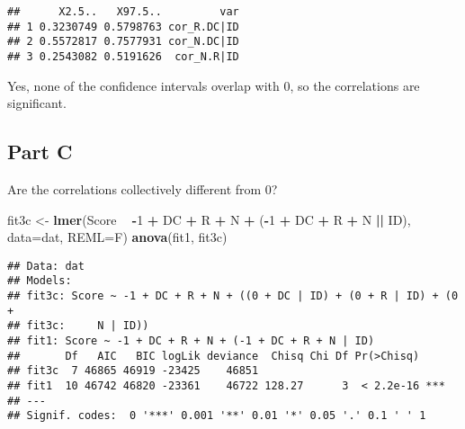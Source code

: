 \documentclass[]{article}
\newenvironment{Shaded}{\begin{snugshade}}{\end{snugshade}}
\newcommand{\KeywordTok}[1]{\textcolor[rgb]{0.13,0.29,0.53}{\textbf{#1}}}
\newcommand{\DataTypeTok}[1]{\textcolor[rgb]{0.13,0.29,0.53}{#1}}
\newcommand{\DecValTok}[1]{\textcolor[rgb]{0.00,0.00,0.81}{#1}}
\newcommand{\StringTok}[1]{\textcolor[rgb]{0.31,0.60,0.02}{#1}}
\newcommand{\OperatorTok}[1]{\textcolor[rgb]{0.81,0.36,0.00}{\textbf{#1}}}
\newcommand{\NormalTok}[1]{#1}
\begin{document}
\begin{Shaded}
\end{Shaded}

\begin{verbatim}
##      X2.5..   X97.5..         var
## 1 0.3230749 0.5798763 cor_R.DC|ID
## 2 0.5572817 0.7577931 cor_N.DC|ID
## 3 0.2543082 0.5191626  cor_N.R|ID
\end{verbatim}

Yes, none of the confidence intervals overlap with 0, so the
correlations are significant.

\subsection{Part C}\label{part-c}

Are the correlations collectively different from 0?

\begin{Shaded}
\begin{Highlighting}[]
\NormalTok{fit3c <-}\StringTok{ }\KeywordTok{lmer}\NormalTok{(Score }\OperatorTok{~}\StringTok{ }\OperatorTok{-}\DecValTok{1} \OperatorTok{+}\StringTok{ }\NormalTok{DC }\OperatorTok{+}\StringTok{ }\NormalTok{R }\OperatorTok{+}\StringTok{ }\NormalTok{N }\OperatorTok{+}\StringTok{ }
\StringTok{                 }\NormalTok{(}\OperatorTok{-}\DecValTok{1} \OperatorTok{+}\StringTok{ }\NormalTok{DC }\OperatorTok{+}\StringTok{ }\NormalTok{R }\OperatorTok{+}\StringTok{ }\NormalTok{N }\OperatorTok{||}\StringTok{ }\NormalTok{ID), }\DataTypeTok{data=}\NormalTok{dat,}
                 \DataTypeTok{REML=}\NormalTok{F)}
\KeywordTok{anova}\NormalTok{(fit1, fit3c)}
\end{Highlighting}
\end{Shaded}

\begin{verbatim}
## Data: dat
## Models:
## fit3c: Score ~ -1 + DC + R + N + ((0 + DC | ID) + (0 + R | ID) + (0 + 
## fit3c:     N | ID))
## fit1: Score ~ -1 + DC + R + N + (-1 + DC + R + N | ID)
##       Df   AIC   BIC logLik deviance  Chisq Chi Df Pr(>Chisq)    
## fit3c  7 46865 46919 -23425    46851                             
## fit1  10 46742 46820 -23361    46722 128.27      3  < 2.2e-16 ***
## ---
## Signif. codes:  0 '***' 0.001 '**' 0.01 '*' 0.05 '.' 0.1 ' ' 1
\end{verbatim}
\end{document}

